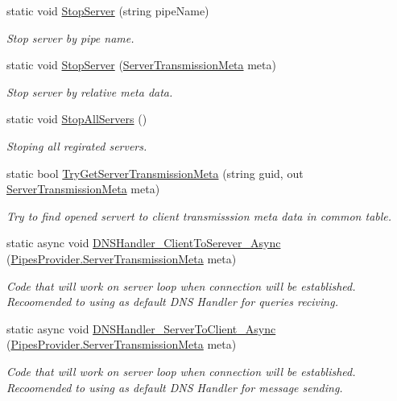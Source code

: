 \begin{DoxyCompactItemize}
static void \mbox{\hyperlink{class_pipes_provider_1_1_a_p_i_a1a81c47121d56bca83bd3cbf058d6478}{Stop\+Server}} (string pipe\+Name)
\begin{DoxyCompactList}\small\item\em Stop server by pipe name. \end{DoxyCompactList}\item 
static void \mbox{\hyperlink{class_pipes_provider_1_1_a_p_i_aec56e2367941c5cbf6501298a946b41a}{Stop\+Server}} (\mbox{\hyperlink{class_pipes_provider_1_1_server_transmission_meta}{Server\+Transmission\+Meta}} meta)
\begin{DoxyCompactList}\small\item\em Stop server by relative meta data. \end{DoxyCompactList}\item 
static void \mbox{\hyperlink{class_pipes_provider_1_1_a_p_i_a5ec1b30c068984a8dbff3a5a4d41a8b7}{Stop\+All\+Servers}} ()
\begin{DoxyCompactList}\small\item\em Stoping all regirated servers. \end{DoxyCompactList}\item 
static bool \mbox{\hyperlink{class_pipes_provider_1_1_a_p_i_a5eb987a8a4edfb2b26d861071aca70a2}{Try\+Get\+Server\+Transmission\+Meta}} (string guid, out \mbox{\hyperlink{class_pipes_provider_1_1_server_transmission_meta}{Server\+Transmission\+Meta}} meta)
\begin{DoxyCompactList}\small\item\em Try to find opened servert to client transmisssion meta data in common table. \end{DoxyCompactList}\item 
static async void \mbox{\hyperlink{class_pipes_provider_1_1_a_p_i_ade8af5541a5787e55fe07bad71298132}{D\+N\+S\+Handler\+\_\+\+Client\+To\+Serever\+\_\+\+Async}} (\mbox{\hyperlink{class_pipes_provider_1_1_server_transmission_meta}{Pipes\+Provider.\+Server\+Transmission\+Meta}} meta)
\begin{DoxyCompactList}\small\item\em Code that will work on server loop when connection will be established. Recoomended to using as default D\+NS Handler for queries reciving. \end{DoxyCompactList}\item 
static async void \mbox{\hyperlink{class_pipes_provider_1_1_a_p_i_af1648503e83d5ecd72af553ea5d461f5}{D\+N\+S\+Handler\+\_\+\+Server\+To\+Client\+\_\+\+Async}} (\mbox{\hyperlink{class_pipes_provider_1_1_server_transmission_meta}{Pipes\+Provider.\+Server\+Transmission\+Meta}} meta)
\begin{DoxyCompactList}\small\item\em Code that will work on server loop when connection will be established. Recoomended to using as default D\+NS Handler for message sending. \end{DoxyCompactList}\end{DoxyCompactItemize}
